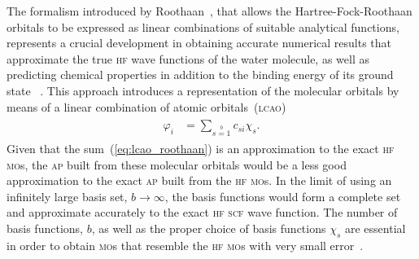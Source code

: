 The formalism introduced by Roothaan~\cite{Roothaan_HF}, that allows
the Hartree-Fock-Roothaan orbitals to be expressed as linear
combinations of suitable analytical functions, represents a crucial
development in obtaining accurate numerical results that approximate
the true \textsc{hf} wave functions of the water molecule, as well as
predicting chemical properties in addition to the binding energy of
its ground state
~\cite{scf_lc_1967,EllisonShullh2o_1955,Neumann_gaussian_1968,Pitzer_1970,Pitzer_1972}.
This approach introduces a representation of the molecular orbitals by
means of a linear combination of atomic
orbitals~(\textsc{lcao})~\cite{Roothaan_HF}
%
\begin{eqnarray}
  \begin{split}
    \varphi_{i} & = \sum\limits_{s=1}\limits^{b} c_{si} \chi_{s}.
  \end{split}
  \label{eq:lcao_roothaan}
\end{eqnarray}
%
Given that the sum~(\ref{eq:lcao_roothaan}) is an approximation to the
exact \textsc{hf} \textsc{mo}s, the \textsc{ap} built from these
molecular orbitals would be a less good approximation to the exact
\textsc{ap} built from the \textsc{hf} \textsc{mo}s. In the limit of
using an infinitely large basis set, $b\to\infty$, the basis functions
would form a complete set and approximate accurately to the exact
\textsc{hf} \textsc{scf} wave function. The number of basis functions,
$b$, as well as the proper choice of basis functions $\chi_{s}$ are
essential in order to obtain \textsc{mo}s that resemble the
\textsc{hf} \textsc{mo}s with very small
error~\cite{Moccia_JCP_2164,Moccia_JCP_2176,Moccia_1964}.

